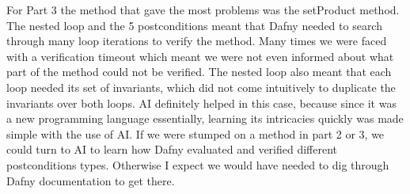 \documentclass[11pt,a4paper]{article}
\begin{document}
For Part 3 the method that gave the most problems was the setProduct method. The nested loop and the 5 postconditions meant that Dafny needed to search through many loop iterations to verify the method. Many times we were faced with a verification timeout which meant we were not even informed about what part of the method could not be verified. The nested loop also meant that each loop needed its set of invariants, which did not come intuitively to duplicate the invariants over both loops.
AI definitely helped in this case, because since it was a new programming language essentially, learning its intricacies quickly was made simple with the use of AI. If we were stumped on a method in part 2 or 3, we could turn to AI to learn how Dafny evaluated and verified different postconditions types. Otherwise I expect we would have needed to dig through Dafny documentation to get there.
\end{document}
